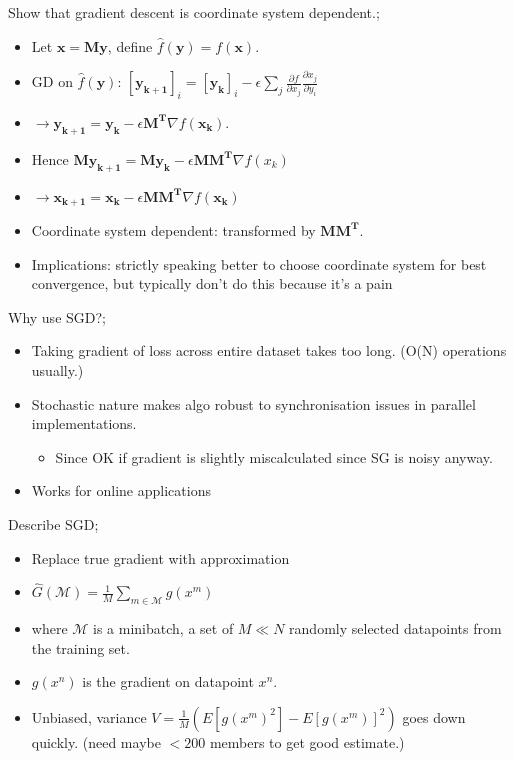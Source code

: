 \documentclass{article}
\begin{document}
Show that gradient descent is coordinate system dependent.; \begin{itemize} \item Let $\mathbf{x=My}$, define $\hat{f}(\mathbf{y})=f(\mathbf{x})$.  \item GD on $\hat{f}(\mathbf{y})$: $[\mathbf{y_{k+1}}]_i = [\mathbf{y_k}]_i - \epsilon \sum_j \frac{\partial f}{\partial x_j}\frac{\partial x_j}{\partial y_i}$ \item $\rightarrow \mathbf{y_{k+1}} = \mathbf{y_k} - \epsilon \mathbf{M^T}\nabla f(\mathbf{x_k})$.  \item Hence $\mathbf{My_{k+1}=My_k}-\epsilon \mathbf{MM^T}\nabla f(x_k)$ \item $\rightarrow \mathbf{x_{k+1}}=\mathbf{x_k}-\epsilon\mathbf{MM^T}\nabla f(\mathbf{x_k})$ \item Coordinate system dependent: transformed by $\mathbf{MM^T}$.  \item Implications: strictly speaking better to choose coordinate system for best convergence, but typically don't do this because it's a pain \end{itemize} 

Why use SGD?; \begin{itemize} \item Taking gradient of loss across entire dataset takes too long. (O(N) operations usually.) \item Stochastic nature makes algo robust to synchronisation issues in parallel implementations. \begin{itemize} \item Since OK if gradient is slightly miscalculated since SG is noisy anyway.  \end{itemize} \item Works for online applications \end{itemize}

Describe SGD; \begin{itemize} \item Replace true gradient with approximation \item $\hat{G}(\mathcal{M}) = \frac{1}{M}\sum_{m\in\mathcal{M}} g(x^m)$ \item where $\mathcal{M}$ is a minibatch, a set of $M\ll N$ randomly selected datapoints from the training set.  \item $g(x^n)$ is the gradient on datapoint $x^n$.  \item Unbiased, variance $V=\frac{1}{M}(E[g(x^m)^2]-E[g(x^m)]^2)$ goes down quickly. (need maybe $< 200$ members to get good estimate.) \end{itemize}
\end{document}
